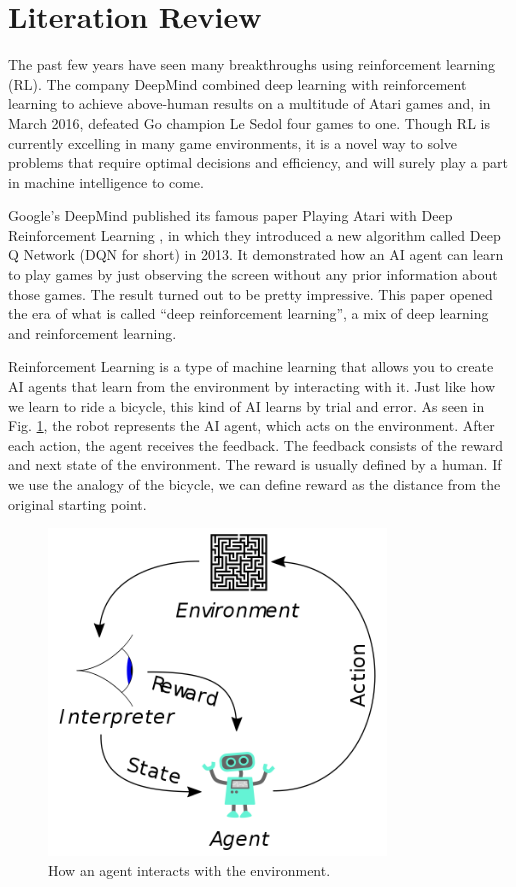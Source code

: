 \section{Literation Review}

The past few years have seen many breakthroughs using reinforcement learning (RL). The company DeepMind combined deep learning with reinforcement learning to achieve above-human results on a multitude of Atari games and, in March 2016, defeated Go champion Le Sedol four games to one. Though RL is currently excelling in many game environments, it is a novel way to solve problems that require optimal decisions and efficiency, and will surely play a part in machine intelligence to come.


Google's DeepMind published its famous paper Playing Atari with Deep Reinforcement Learning \cite {Mnih2015AtariNature}, in which they introduced a new algorithm called Deep Q Network (DQN for short) in 2013. It demonstrated how an AI agent can learn to play games by just observing the screen without any prior information about those games. The result turned out to be pretty impressive. This paper opened the era of what is called ``deep reinforcement learning'', a mix of deep learning and reinforcement learning.

Reinforcement Learning is a type of machine learning that allows you to create AI agents that learn from the environment by interacting with it. Just like how we learn to ride a bicycle, this kind of AI learns by trial and error. As seen in Fig. \ref {fig:deepmind}, the robot represents the AI agent, which acts on the environment. After each action, the agent receives the feedback. The feedback consists of the reward and next state of the environment. The reward is usually defined by a human. If we use the analogy of the bicycle, we can define reward as the distance from the original starting point.

\begin{figure}[h] 
\centering
\includegraphics[width=0.8\textwidth]{figs/ch1/Reinforcement_learning_diagram}
\caption{How an agent interacts with the environment.}
\label{fig:deepmind}
\end{figure}

